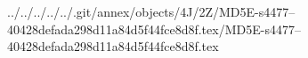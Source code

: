 ../../../../../.git/annex/objects/4J/2Z/MD5E-s4477--40428defada298d11a84d5f44fce8d8f.tex/MD5E-s4477--40428defada298d11a84d5f44fce8d8f.tex